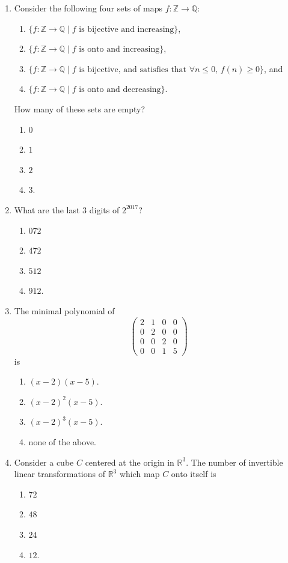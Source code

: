 \documentclass[11pt, a4paper]{article}
\begin{document}
\begin{enumerate}
  \item Consider the following four sets of maps $f: \mathbb{Z} \to \mathbb{Q}$:
  \begin{enumerate}[label=(\roman*)]
    \item $\{f: \mathbb{Z} \to \mathbb{Q} \mid f \text{ is bijective and increasing}\}$,
    \item $\{f: \mathbb{Z} \to \mathbb{Q} \mid f \text{ is onto and increasing}\}$,
    \item $\{f: \mathbb{Z} \to \mathbb{Q} \mid f \text{ is bijective, and satisfies that } \forall n \le 0, \, f(n) \ge 0\}$, and
    \item $\{f: \mathbb{Z} \to \mathbb{Q} \mid f \text{ is onto and decreasing}\}$.
  \end{enumerate}
  How many of these sets are empty?
  \begin{enumerate}[label=(\alph*)]
    \item $0$
    \item $1$
    \item $2$
    \item $3$.
  \end{enumerate}

  \item What are the last $3$ digits of $2^{2017}$?
  \begin{enumerate}[label=(\alph*)]
    \item $072$
    \item $472$
    \item $512$
    \item $912$.
  \end{enumerate}

  \item The minimal polynomial of
  \[
    \begin{pmatrix}
      2 & 1 & 0 & 0 \\
      0 & 2 & 0 & 0 \\
      0 & 0 & 2 & 0 \\
      0 & 0 & 1 & 5
    \end{pmatrix}
  \]
  is
  \begin{enumerate}[label=(\alph*)]
    \item $(x - 2)(x - 5)$.
    \item $(x - 2)^2(x - 5)$.
    \item $(x - 2)^3(x - 5)$.
    \item none of the above.
  \end{enumerate}

  \item Consider a cube $C$ centered at the origin in $\mathbb{R}^3$. The number of invertible linear transformations of $\mathbb{R}^3$ which map $C$ onto itself is
  \begin{enumerate}[label=(\alph*)]
    \item $72$
    \item $48$
    \item $24$
    \item $12$.
  \end{enumerate}


\end{enumerate}
\end{document}

